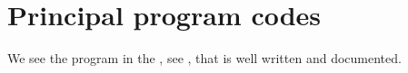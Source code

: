 \chapter{Principal program codes}\label{ch:CODES}

\lstset{language=Python}

We see the program in the   , see \cite{listingCite}, that is well written and documented.







